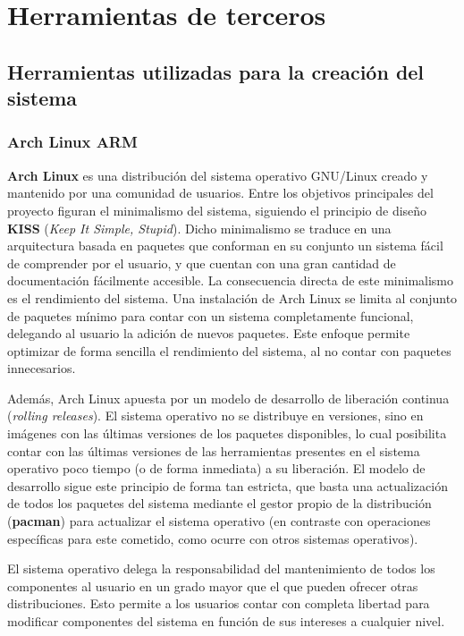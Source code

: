 \chapter{Herramientas de terceros}

\section{Herramientas utilizadas para la creación del sistema}

\subsection{Arch Linux ARM}
\label{archlinux:description}

\textbf{Arch Linux} es una distribución del sistema operativo GNU/Linux creado y mantenido por una comunidad de usuarios. Entre los objetivos principales del proyecto figuran el minimalismo del sistema, siguiendo el principio de diseño \textbf{KISS} (\textit{Keep It Simple, Stupid}). Dicho minimalismo se traduce en una arquitectura basada en paquetes que conforman en su conjunto un sistema fácil de comprender por el usuario, y que cuentan con una gran cantidad de documentación fácilmente accesible. La consecuencia directa de este minimalismo es el rendimiento del sistema. Una instalación de Arch Linux se limita al conjunto de paquetes mínimo para contar con un sistema completamente funcional, delegando al usuario la adición de nuevos paquetes. Este enfoque permite optimizar de forma sencilla el rendimiento del sistema, al no contar con paquetes innecesarios.

Además, Arch Linux apuesta por un modelo de desarrollo de liberación continua (\textit{rolling releases}). El sistema operativo no se distribuye en versiones, sino en imágenes con las últimas versiones de los paquetes disponibles, lo cual posibilita contar con las últimas versiones de las herramientas presentes en el sistema operativo poco tiempo (o de forma inmediata) a su liberación. El modelo de desarrollo sigue este principio de forma tan estricta, que basta una actualización de todos los paquetes del sistema mediante el gestor propio de la distribución (\textbf{pacman}) para actualizar el sistema operativo (en contraste con operaciones específicas para este cometido, como ocurre con otros sistemas operativos).

El sistema operativo delega la responsabilidad del mantenimiento de todos los componentes al usuario en un grado mayor que el que pueden ofrecer otras distribuciones. Esto permite a los usuarios contar con completa libertad para modificar componentes del sistema en función de sus intereses a cualquier nivel.

